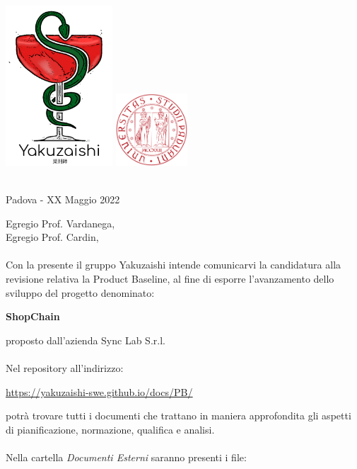 \documentclass[a4paper, 10pt]{article}
\begin{document}
\begin{center}
\includegraphics[width=0.3\textwidth]{../template/images/logo.png}
\hspace{3cm}
\includegraphics[width=0.2\textwidth]{../template/images/logoUnipd.png}\\
\end{center}
\begin{flushright}
    \
    \textbf{}\\
    Padova - XX Maggio 2022
\end{flushright}
Egregio Prof. Vardanega,\\
Egregio Prof. Cardin,\\\\
Con la presente il gruppo Yakuzaishi intende comunicarvi la candidatura alla revisione relativa la Product Baseline, al fine di esporre l'avanzamento dello sviluppo del progetto denominato:
\begin{center}
    \textbf{ShopChain}
\end{center}
proposto dall'azienda Sync Lab S.r.l.\\\\
Nel repository all'indirizzo:
\begin{center}
    \href{https://yakuzaishi-swe.github.io/docs/PB/}{\underline{https://yakuzaishi-swe.github.io/docs/PB/}}\\ 
\end{center}
potrà trovare tutti i documenti che trattano in maniera approfondita gli aspetti di pianificazione, normazione, qualifica e analisi.\\\\
Nella cartella \textit{Documenti Esterni} saranno presenti i file:
\end{document}
